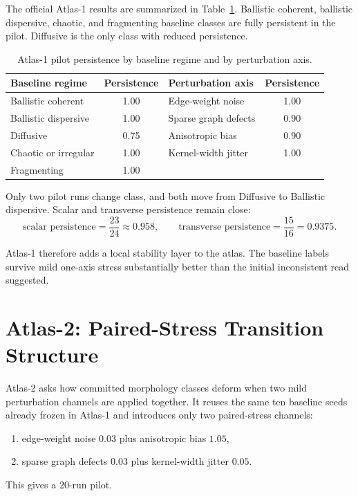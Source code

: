 \documentclass[11pt]{article}
\begin{document}
The official Atlas-1 results are summarized in Table~\ref{tab:atlas1-persistence}. Ballistic coherent, ballistic dispersive, chaotic, and fragmenting baseline classes are fully persistent in the pilot. Diffusive is the only class with reduced persistence.

\begin{table}[t]
\centering
\begin{tabular}{lc|lc}
\hline
Baseline regime & Persistence & Perturbation axis & Persistence \\
\hline
Ballistic coherent & 1.00 & Edge-weight noise & 1.00 \\
Ballistic dispersive & 1.00 & Sparse graph defects & 0.90 \\
Diffusive & 0.75 & Anisotropic bias & 0.90 \\
Chaotic or irregular & 1.00 & Kernel-width jitter & 1.00 \\
Fragmenting & 1.00 & & \\
\hline
\end{tabular}
\caption{Atlas-1 pilot persistence by baseline regime and by perturbation axis.}
\label{tab:atlas1-persistence}
\end{table}

Only two pilot runs change class, and both move from Diffusive to Ballistic dispersive. Scalar and transverse persistence remain close:
\begin{equation}
\text{scalar persistence} = \frac{23}{24} \approx 0.958,
\qquad
\text{transverse persistence} = \frac{15}{16} = 0.9375.
\end{equation}

Atlas-1 therefore adds a local stability layer to the atlas. The baseline labels survive mild one-axis stress substantially better than the initial inconsistent read suggested.

\section{Atlas-2: Paired-Stress Transition Structure}
Atlas-2 asks how committed morphology classes deform when two mild perturbation channels are applied together. It reuses the same ten baseline seeds already frozen in Atlas-1 and introduces only two paired-stress channels:
\begin{enumerate}
\item edge-weight noise $0.03$ plus anisotropic bias $1.05$,
\item sparse graph defects $0.03$ plus kernel-width jitter $0.05$.
\end{enumerate}
This gives a 20-run pilot.
\end{document}
